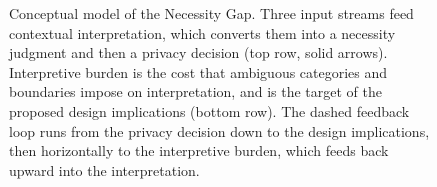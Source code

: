 \begin{figure}[!tbp]
{%
}
\caption{Conceptual model of the Necessity Gap. Three input streams
feed contextual interpretation, which converts them into a necessity
judgment and then a privacy decision (top row, solid arrows).
Interpretive burden is the cost that ambiguous categories and
boundaries impose on interpretation, and is the target of the
proposed design implications (bottom row). The dashed feedback loop
runs from the privacy decision down to the design implications, then
horizontally to the interpretive burden, which feeds back upward into
the interpretation.}
\label{fig:discussion-model}
\end{figure}
